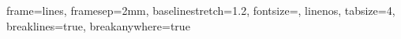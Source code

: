 \usepackage[newfloat]{minted}
\newenvironment{code}{\captionsetup{type=listing}}{}
\captionsetup[listing]{skip=-7pt}

\newenvironment{longlisting}{\captionsetup{type=listing}}

\setminted{
    frame=lines,
    framesep=2mm,
    baselinestretch=1.2,
    fontsize=\footnotesize,
    linenos,
    tabsize=4,
    breaklines=true,
    breakanywhere=true
}

\renewcommand{\theFancyVerbLine}{\scriptsize\textcolor[rgb]{0.7,0.7,0.7}{\arabic{FancyVerbLine}}}